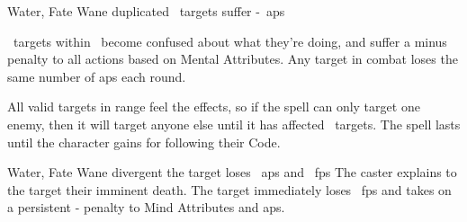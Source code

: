   {Water, Fate}%
  {Wane}%
  {duplicated}%
  {}%
  {\spellArea\ targets suffer -~\glspl{ap}}%
  {
    \spellArea\ targets within \spellRange\ become confused about what they're doing, and suffer a minus  penalty to all actions based on Mental Attributes.
    Any target in combat loses the same number of \glspl{ap} each round.

    All valid targets in range feel the effects, so if the spell can only target one enemy, then it will target anyone else until it has affected \spellArea\ targets.
    The spell lasts until the character gains  for following their Code.
  }

  {Water, Fate}%
  {Wane}%
  {divergent}%
  {}%
  {the target loses ~\glspl{ap} and \rollConv~\glspl{fp}}%
  {
    The caster explains to the target their imminent death.
    The target immediately loses \rollConv\ \glspl{fp} and takes on a persistent - penalty to Mind Attributes and \glspl{ap}.
  }
